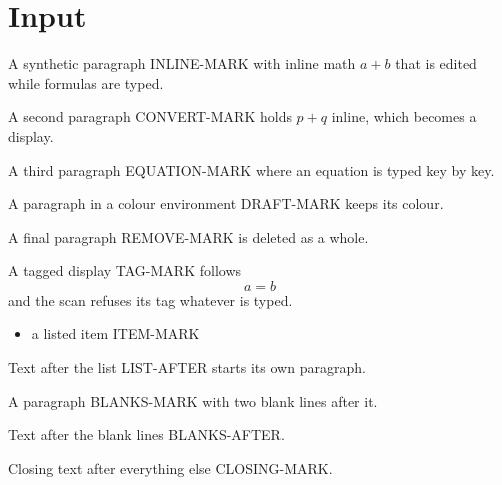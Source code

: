 \documentclass{article}
\newenvironment{Draft}{\color{teal}}{\ignorespacesafterend}
\begin{document}
\section{Input}
A synthetic paragraph INLINE-MARK with inline math $a+b$ that is edited while formulas are typed.

A second paragraph CONVERT-MARK holds $p+q$ inline, which becomes a display.

A third paragraph EQUATION-MARK where an equation is typed key by key.

\begin{Draft}
A paragraph in a colour environment DRAFT-MARK keeps its colour.
\end{Draft}

A final paragraph REMOVE-MARK is deleted as a whole.

A tagged display TAG-MARK follows
\begin{equation} a=b \tag{$*$} \end{equation}
and the scan refuses its tag whatever is typed.

\begin{itemize}
\item a listed item ITEM-MARK
\end{itemize}

Text after the list LIST-AFTER starts its own paragraph.

A paragraph BLANKS-MARK with two blank lines after it.


Text after the blank lines BLANKS-AFTER.

Closing text after everything else CLOSING-MARK.
\end{document}
